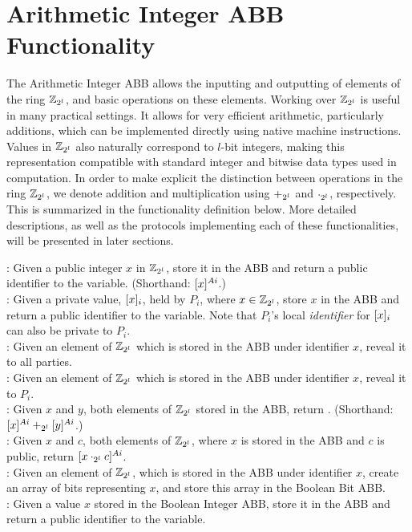 \section{Arithmetic Integer ABB Functionality}

The Arithmetic Integer ABB allows the inputting and outputting of elements of the ring $\mathbb{Z}_{2^l}$, and basic operations on these elements.
Working over $\mathbb{Z}_{2^l}$ is useful in many practical settings.
It allows for very efficient arithmetic, particularly additions, which can be implemented directly using native machine instructions.
Values in $\mathbb{Z}_{2^l}$ also naturally correspond to $l$-bit integers, making this representation compatible with standard integer and bitwise data types used in computation.
In order to make explicit the distinction between operations in the ring $\mathbb{Z}_{2^l}$, we denote addition and multiplication using $+_{2^l}$ and $\cdot_{2^l}$, respectively.
This is summarized in the functionality definition below.
More detailed descriptions, as well as the protocols implementing each of these functionalities, will be presented in later sections.

\begin{functionality}
	
	: Given a public integer $x$ in $\mathbb{Z}_{2^l}$, store it in the ABB and return a public identifier to the variable. 
	(Shorthand: $[x]^{Ai}$.)\\
	
	:  Given a private value, $[x]_{i}$, held by $P_i$, where $x \in \mathbb{Z}_{2^l}$,
	store $x$ in the ABB and return a public identifier to the variable. 
    Note that $P_i$'s local \emph{identifier} for $[x]_{i}$ can also be private to $P_i$. \\
	
	: Given an element of $\mathbb{Z}_{2^l}$ which is stored in the ABB under identifier $x$, reveal it to all parties. \\
	
	:  Given an element of $\mathbb{Z}_{2^l}$ which is stored in the ABB under identifier $x$, reveal it to $P_i$. \\
	
	: Given $x$ and $y$, both elements of $\mathbb{Z}_{2^l}$ stored in the ABB, return . (Shorthand: $[x]^{Ai} +_{2^l} [y]^{Ai}$.) \\

    : Given $x$ and $c$, both elements of $\mathbb{Z}_{2^l}$, where $x$ is stored in the ABB and $c$ is public, return $[x \cdot_{2^l} c]^{Ai}$. \\

	: Given an element of $\mathbb{Z}_{2^l}$, which is stored in the ABB under identifier $x$, create an array of bits representing $x$, and store this array in the Boolean Bit ABB. \\

	: Given a value $x$ stored in the Boolean Integer ABB, store it in the ABB and return a public identifier to the variable. \\

\end{functionality}
